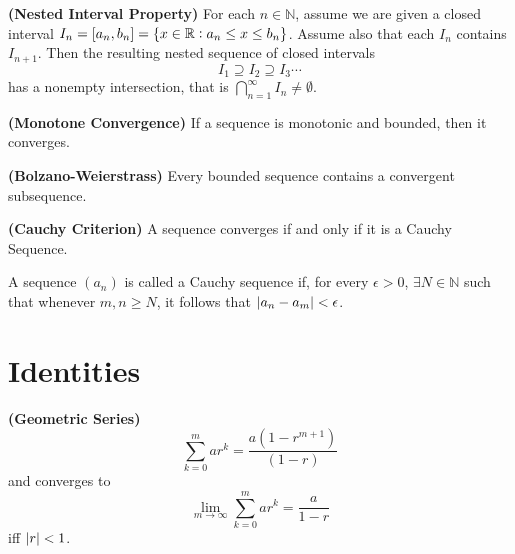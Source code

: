 \begin{theorem}
  \textbf{\textup{(Nested Interval Property)}}
  For each $n\in \mathbb{N}$, assume we are given a closed interval $I_n = \left[a_n, b_n\right] = \{x \in \mathbb{R}:a_n \leq x \leq b_n\}$.
  Assume also that each $I_n$ contains $I_{n+1}$. Then the resulting nested sequence of closed intervals
  \begin{equation*}
    I_1 \supseteq I_2 \supseteq I_3 \cdots
  \end{equation*}
  has a nonempty intersection, that is $\bigcap_{n=1}^\infty I_n \neq \emptyset$.
\end{theorem}

\begin{theorem}
  \textbf{\textup{(Monotone Convergence)}}
  If a sequence is monotonic and bounded, then it converges.
\end{theorem}

\begin{theorem}
  \textbf{\textup{(Bolzano-Weierstrass)}}
  Every bounded sequence contains a convergent subsequence.
\end{theorem}

\begin{theorem}
  \textbf{\textup{(Cauchy Criterion)}}
  A sequence converges if and only if it is a Cauchy Sequence.
  
  A sequence $(a_n)$ is called a Cauchy sequence if, for every $\epsilon > 0$,
  $\exists N \in \mathbb{N}$ such that whenever $m, n \geq N$, it follows that $\abs{a_n - a_m} < \epsilon$.
\end{theorem}

\section{Identities}
\begin{identity}
  \textbf{\textup{(Geometric Series)}}
  \begin{equation}
    \sum_{k=0}^m ar^k = \frac{a(1-r^{m+1})}{(1-r)}
    \label{eq:geometric_series}
  \end{equation}
  and converges to 
  \begin{equation*}
    \lim_{m\to\infty} \sum_{k=0}^m ar^k = \frac{a}{1-r}
  \end{equation*}
  iff $\abs{r} < 1$.
\end{identity}